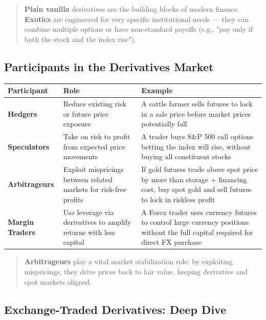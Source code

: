 \documentclass[12pt,openany]{book}
\begin{document}
\begin{quote}
    \textbf{Plain vanilla} derivatives are the building blocks of modern finance. \textbf{Exotics} are engineered for very specific institutional needs --- they can combine multiple options or have non-standard payoffs (e.g., "pay only if both the stock and the index rise").
\end{quote}

\subsection{Participants in the Derivatives Market}

\begin{center}
\small
\renewcommand{\arraystretch}{1.2}
\begin{tabular}{|L{0.20\textwidth}|L{0.28\textwidth}|L{0.42\textwidth}|}
\hline
\textbf{Participant} & \textbf{Role} & \textbf{Example} \\ \hline
\textbf{Hedgers} & Reduce existing risk or future price exposure & A cattle farmer sells futures to lock in a sale price before market prices potentially fall \\ \hline
\textbf{Speculators} & Take on risk to profit from expected price movements & A trader buys S\&P 500 call options betting the index will rise, without buying all constituent stocks \\ \hline
\textbf{Arbitrageurs} & Exploit mispricings between related markets for risk-free profits & If gold futures trade above spot price by more than storage + financing cost, buy spot gold and sell futures to lock in riskless profit \\ \hline
\textbf{Margin Traders} & Use leverage via derivatives to amplify returns with less capital & A Forex trader uses currency futures to control large currency positions without the full capital required for direct FX purchase \\ \hline
\end{tabular}
\end{center}

\begin{quote}
    \textbf{Arbitrageurs} play a vital market stabilization role: by exploiting mispricings, they drive prices back to fair value, keeping derivative and spot markets aligned.
\end{quote}

\subsection{Exchange-Traded Derivatives: Deep Dive}
\end{document}
